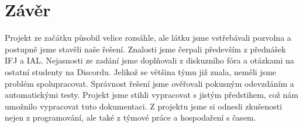 \documentclass[a4paper, 12pt]{article}
\begin{document}
\section{Závěr}
Projekt ze začátku působil velice rozsáhle, ale látku jsme vstřebávali pozvolna a postupně jsme stavěli naše řešení. Znalosti jsme čerpali především z přednášek IFJ a IAL. Nejasnosti ze zadání jsme doplňovali z diskuzního fóra a otázkami na ostatní studenty na Discordu. Jelikož se většina týmu již znala, neměli jsme problém spolupracovat. Správnost řešení jsme ověřovali pokusným odevzdáním a automatickými testy. Projekt jsme stihli vypracovat s jistým předstihem, což nám umožnilo vypracovat tuto dokumentaci. Z projektu jsme si odnesli zkušenosti nejen z programování, ale také z týmové práce a hospodaření s časem.

\newpage
{}


\end{document}
